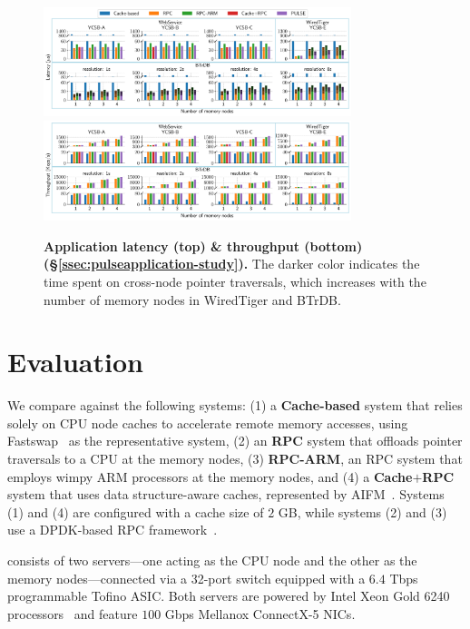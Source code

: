 \begin{figure}[t]
\centering
  \includegraphics[width=0.8\textwidth]{fig/pulse/latency.pdf}
  \\
  \includegraphics[width=0.8\textwidth]{fig/pulse/throughput.pdf}
  \caption[Application latency \& throughput]{\textbf{Application latency (top) \& throughput (bottom) (\S\ref{ssec:pulseapplication-study}).} 
  The darker color indicates the time spent on cross-node pointer traversals, which increases with the number of memory nodes in WiredTiger and BTrDB.}
\label{fig:eval_perf_e2e_latency}
\label{fig:eval_perf_e2e_throughput}
\end{figure}

\section{Evaluation}
\label{sec:pulseevaluation}



 We compare \pulse against the following systems: 
(1) a \textbf{Cache-based} system that relies solely on CPU node caches to accelerate remote memory accesses, using Fastswap~\cite{fastswap} as the representative system, 
(2) an \textbf{RPC} system that offloads pointer traversals to a CPU at the memory nodes, 
(3) \textbf{RPC-ARM}, an RPC system that employs wimpy ARM processors at the memory nodes, and 
(4) a \textbf{Cache$+$RPC} system that uses data structure-aware caches, represented by AIFM~\cite{aifm}. Systems (1) and (4) are configured with a cache size of $2$ GB, while systems (2) and (3) use a DPDK-based RPC framework~\cite{erpc}.

 consists of two servers—one acting as the CPU node and the other as the memory nodes—connected via a 32-port switch equipped with a $6.4$ Tbps programmable Tofino ASIC. Both servers are powered by Intel Xeon Gold 6240 processors~\cite{intelprocessor} and feature $100$ Gbps Mellanox ConnectX-5 NICs. 


